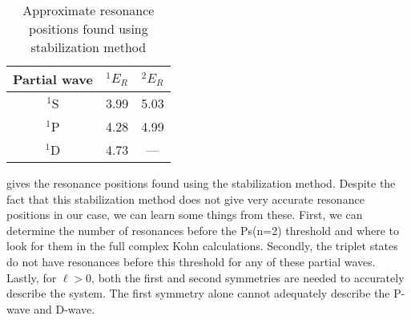 \documentclass[Dissertation.tex]{subfiles}
\begin{document}
\begin{table}
\centering
\begin{tabular}{c c c}
\toprule
Partial wave & $^1E_R$ & $^2E_R$ \\
\midrule
$^1$S & 3.99 & 5.03  \\
$^1$P & 4.28 & 4.99  \\
$^1$D & 4.73 & ---   \\
\bottomrule
\end{tabular}
\caption{Approximate resonance positions found using stabilization method}
\label{tab:Stabilization}
\end{table}

 gives the resonance positions found using the 
stabilization method. Despite the fact that this stabilization method does 
not give very accurate resonance positions in our case, we can learn some 
things from these. First, we can determine the number of resonances before 
the Ps(n=2) threshold and where to look for them in the full complex Kohn 
calculations. Secondly, the triplet states do not have resonances before this 
threshold for any of these partial waves. Lastly, for $\ell > 0$, both the 
first and second symmetries are needed to accurately describe the system. The 
first symmetry alone cannot adequately describe the P-wave and D-wave.



\biblio
\end{document}
